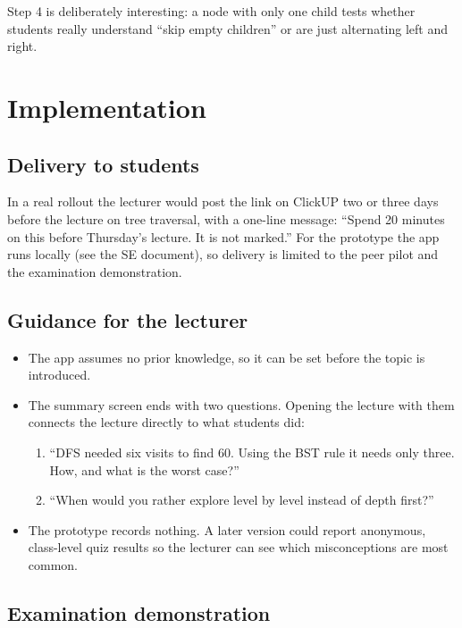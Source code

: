 \documentclass[11pt,a4paper]{article}
\begin{document}
Step 4 is deliberately interesting: a node with only one child tests whether students really
understand ``skip empty children'' or are just alternating left and right.

\section{Implementation}
\label{sec:impl}

\subsection{Delivery to students}

In a real rollout the lecturer would post the link on ClickUP two or three days before the lecture
on tree traversal, with a one-line message: ``Spend 20 minutes on this before Thursday's lecture.
It is not marked.'' For the prototype the app runs locally (see the SE document), so delivery is
limited to the peer pilot and the examination demonstration.

\subsection{Guidance for the lecturer}

\begin{itemize}
  \item The app assumes no prior knowledge, so it can be set before the topic is introduced.
  \item The summary screen ends with two questions. Opening the lecture with them connects the
        lecture directly to what students did:
        \begin{enumerate}
          \item ``DFS needed six visits to find 60. Using the BST rule it needs only three. How,
                and what is the worst case?''
          \item ``When would you rather explore level by level instead of depth first?''
        \end{enumerate}
  \item The prototype records nothing. A later version could report anonymous, class-level quiz
        results so the lecturer can see which misconceptions are most common.
\end{itemize}

\subsection{Examination demonstration}
\end{document}
